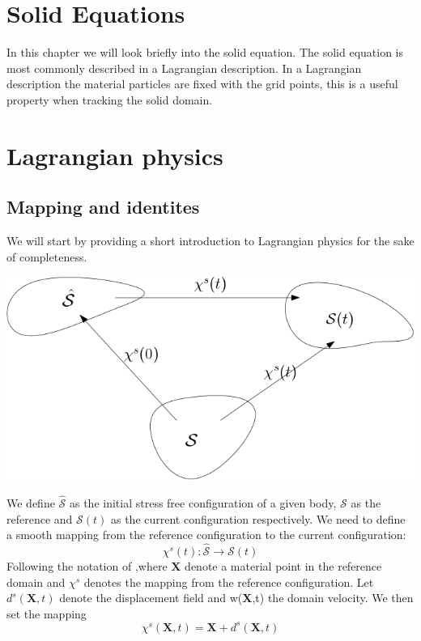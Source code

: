\section{Solid Equations}
In this chapter we will look briefly into the solid equation. The solid equation is most commonly described in a Lagrangian description. In a Lagrangian description the material particles are fixed with the grid points, this is a useful property when tracking the solid domain.

\section*{Lagrangian physics}
\subsection*{Mapping and identites}
We will start by providing a short introduction to Lagrangian physics for the sake of completeness.
\begin{center}
\includegraphics[scale=0.4]{continuum_mapping.png}
\end{center}
We define $ \hat{\mathcal{S}}$ as the initial stress free configuration of a given body, $\mathcal{S}$ as the reference and $\mathcal{S}(t)$ as the current configuration respectively.
We need to define a smooth mapping from the reference configuration to the current configuration:
\begin{equation}
\chi^s(t) : \hat{\mathcal{S}} \rightarrow \mathcal{S}(t)     
\end{equation}
Following the notation of \cite{Holzapfel2000},where $\textbf{X}$ denote a material point in the reference domain and $\chi^s$ denotes the mapping from the reference configuration. 
Let $d^s(\textbf{X},t)$ denote the displacement field and w(\textbf{X},t) the domain velocity. We then set the mapping
\begin{equation}
 \chi^s(\textbf{X},t) = \textbf{X}  + d^s(\textbf{X} ,t) 
\end{equation}

